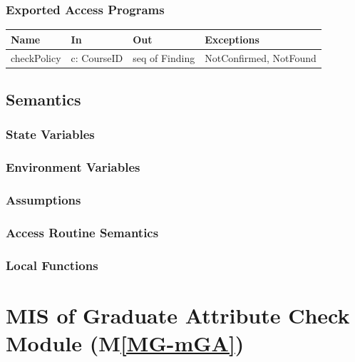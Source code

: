 \documentclass[12pt, titlepage]{article}
\newcommand{\mref}[1]{M\ref{MG-#1}}
\begin{document}
\subsubsection{Exported Access Programs}
\begin{center}\small
\begin{tabular}{>{\raggedright\arraybackslash}p{3.3cm} >{\raggedright\arraybackslash}p{4.1cm} >{\raggedright\arraybackslash}p{3.4cm} >{\raggedright\arraybackslash}p{4.0cm}}
\hline
\textbf{Name} & \textbf{In} & \textbf{Out} & \textbf{Exceptions} \\
\hline
checkPolicy & c: CourseID & seq of Finding & NotConfirmed, NotFound \\
\hline
\end{tabular}
\end{center}

\subsection{Semantics}

\subsubsection{State Variables}


\subsubsection{Environment Variables}


\subsubsection{Assumptions}

\subsubsection{Access Routine Semantics}

\subsubsection{Local Functions}

\newpage

\section{MIS of Graduate Attribute Check Module (\mref{mGA})} \label{mis-mGA}
\end{document}
